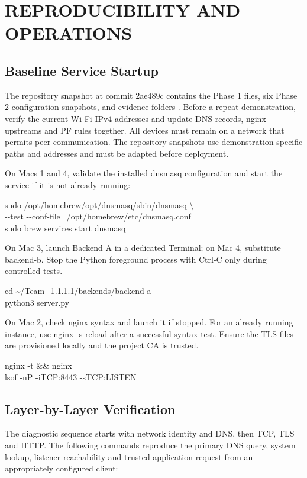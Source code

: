 \documentclass[conference]{IEEEtran}
\begin{document}
\section{REPRODUCIBILITY AND
OPERATIONS}\label{vi.-reproducibility-and-operations}

\subsection{Baseline Service
Startup}\label{a.-baseline-service-startup}

The repository snapshot at commit 2ae489c contains the Phase 1 files,
six Phase 2 configuration snapshots, and evidence folders \cite{ref2}.
Before a repeat demonstration, verify the current Wi-Fi IPv4 addresses
and update DNS records, nginx upstreams and PF rules together. All
devices must remain on a network that permits peer communication. The
repository snapshots use demonstration-specific paths and addresses and
must be adapted before deployment.

On Macs 1 and 4, validate the installed dnsmasq configuration and start
the service if it is not already running:

sudo /opt/homebrew/opt/dnsmasq/sbin/dnsmasq \textbackslash{}\\
-\/-test -\/-conf-file=/opt/homebrew/etc/dnsmasq.conf\\
sudo brew services start dnsmasq

On Mac 3, launch Backend A in a dedicated Terminal; on Mac 4, substitute
backend-b. Stop the Python foreground process with Ctrl-C only during
controlled tests.

cd \textasciitilde/Team\_1.1.1.1/backends/backend-a\\
python3 server.py

On Mac 2, check nginx syntax and launch it if stopped. For an already
running instance, use nginx -s reload after a successful syntax test.
Ensure the TLS files are provisioned locally and the project CA is
trusted.

nginx -t \&\& nginx\\
lsof -nP -iTCP:8443 -sTCP:LISTEN

\subsection{Layer-by-Layer
Verification}\label{b.-layer-by-layer-verification}

The diagnostic sequence starts with network identity and DNS, then TCP,
TLS and HTTP. The following commands reproduce the primary DNS query,
system lookup, listener reachability and trusted application request
from an appropriately configured client:
\end{document}
